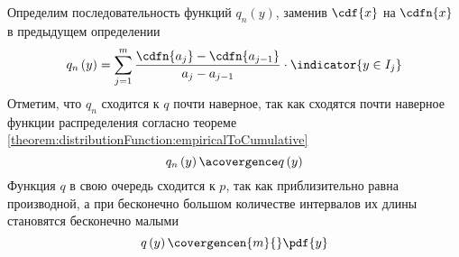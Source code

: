 Определим последовательность функций $q_n\left(y\right)$,
заменив $\cdf{x}$ на $\cdfn{x}$ в предыдущем определении
\begin{equation}\label{eq:histogram_start}
q_n\left(y\right)
= \sum_{j=1}^m \frac{\cdfn{a_j}-\cdfn{a_{j-1}}}{a_j-a_{j-1}}
  \cdot\indicator{y\in I_j}
\end{equation}
Отметим, что $q_n$ сходится к $q$ почти наверное, так как сходятся почти
наверное функции распределения согласно теореме
\ref{theorem:distributionFunction:empiricalToCumulative}
$$q_n\left(y\right)\acovergence q\left(y\right)$$
Функция $q$ в свою очередь сходится к $p$, так как приблизительно равна
производной, а при бесконечно большом количестве интервалов их длины
становятся бесконечно малыми
$$q\left(y\right)\covergencen{m}{}\pdf{y}$$
\begin{comment}
Функция $q_n$ называется гистограммой.
\index{гистограмма}
Избавимся от $a_j$ в формуле, а для этого вспомним, чему равно $\cdfn{x}$
$$\cdfn{x}= \frac{1}{n}\cdot \sum_{k=1}^n
\indicator{x_k\le x}$$

Теперь посмотрим, чему равна разность $\cdfn{a_j}-\cdfn{a_{j-1}}$,
которая, как мы видим, является вероятностью того,
что $x$ попало в отрезок $I_j$
\begin{align*}
  \cdfn{a_j}-\cdfn{a_{j-1}}= \\
  = \frac{1}{n}\cdot \sum_{k=1}^n
    \indicator{x_k\le a_j}-\frac{1}{n}\cdot \sum_{k=1}^n
    \indicator{x_k\le a_{j-1}}
\end{align*}

Сгруппируем слагаемые и получим чуть более компактную запись разности
\begin{eqnarray}\label{eq:cdfn_difference}
  \cdfn{a_j}-\cdfn{a_{j-1}}= \nonumber\\
  = \frac{1}{n}\cdot \sum_{k=1}^n
    \left[\indicator{x_k\le a_j}-\indicator{x_k\le a_{j-1}}\right]
\end{eqnarray}

Рассмотрим возможные значения индикаторов

Если оба индикатора равны единице,
это значит, что $x_k$ не больше $a_j$ и не больше $a_{j-1}$.
Поскольку $a_{j-1}\le a_j$, то можно обойтись тем, что $x\le a_{j-1}$
\begin{align*}
  \begin{cases}
    \indicator{x_k\le a_j}=1\ \
    \indicator{x_k\le a_{j-1}}=1\ \
    a_{j-1} < a_j
  \end{cases}
  \Rightarrow
  \begin{cases}
    x_k\le a_j\ \
    x_k\le a_{j-1}\ \
    a_{j-1} < a_j
  \end{cases}
  \ \\Rightarrow
    x_k\le a_{j-1} < a_j
  \Rightarrow
    x_k\le a_{j-1}
\end{align*}


\end{comment}
